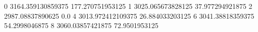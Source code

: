 0 3164.359130859375 177.270751953125
1 3025.065673828125 37.977294921875
2 2987.08837890625 0.0
4 3013.972412109375 26.884033203125
6 3041.38818359375 54.2998046875
8 3060.03857421875 72.9501953125
